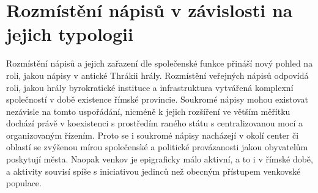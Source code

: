 
\section[rozmístění-nápisů-v-závislosti-na-jejich-typologii]{Rozmístění nápisů v závislosti na jejich typologii}

Rozmístění nápisů a jejich zařazení dle společenské funkce přináší nový pohled na roli, jakou nápisy v antické Thrákii hrály. Rozmístění veřejných nápisů odpovídá roli, jakou hrály byrokratické instituce a infrastruktura vytvářená komplexní společností v době existence římské provincie. Soukromé nápisy mohou existovat nezávisle na tomto uspořádání, nicméně k jejich rozšíření ve větším měřítku dochází právě v koexistenci s prostředím raného státu s centralizovanou mocí a organizovaným řízením. Proto se i soukromé nápisy nacházejí v okolí center či oblastí se zvýšenou mírou společenské a politické provázanosti jakou obyvatelům poskytují města. Naopak venkov je epigraficky málo aktivní, a to i v římské době, a aktivity souvisí spíše s iniciativou jedinců než obecným přístupem venkovské populace.

